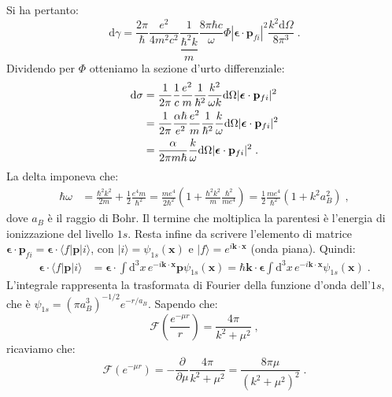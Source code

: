 \documentclass[12pt,a4paper]{report}
\theoremstyle{definition}
\numberwithin{equation}{section}
\newcommand{\diff}[1][]{\mathrm{d}#1}
\newcommand{\bra}{\langle}
\newcommand{\ket}{\rangle}
\begin{document}
Si ha pertanto:
\begin{equation}
\diff{\gamma}=\frac{2\pi}{\hbar}\frac{e^2}{4m^2c^2}\frac{1}{\dfrac{\hbar^2k}{m}}\frac{8\pi\hbar c}{\omega}\Phi|\boldsymbol{\epsilon}\cdot\mathbf{p}_{fi}|^2\frac{k^2\diff{\Omega}}{8\pi^3}\;.
\end{equation}
Dividendo per $\Phi$ otteniamo la sezione d'urto differenziale:
\begin{align}
\diff{\sigma} &= \frac{1}{2\pi}\frac{1}{c}\frac{e^2}{m}\frac{1}{\hbar^2}\frac{k^2}{\omega k}\diff{\Omega}|\boldsymbol{\epsilon}\cdot\mathbf{p}_{fi}|^2 \notag \\
&= \frac{1}{2\pi}\frac{\alpha\hbar}{e^2}\frac{e^2}{m}\frac{1}{\hbar^2}\frac{k}{\omega}\diff{\Omega}|\boldsymbol{\epsilon}\cdot\mathbf{p}_{fi}|^2 \notag \\
&= \frac{\alpha}{2\pi m\hbar}\frac{k}{\omega}\diff{\Omega}|\boldsymbol{\epsilon}\cdot\mathbf{p}_{fi}|^2\;.
\end{align}
La delta imponeva che:
\begin{align}
\hbar\omega &= \frac{\hbar^2k^2}{2m}+\frac{1}{2}\frac{e^4m}{\hbar^2}= \frac{me^4}{2\hbar^2}\left(1+\frac{\hbar^2k^2}{m}\frac{\hbar^2}{me^4}\right)= \frac{1}{2}\frac{me^4}{\hbar^2}(1+k^2a_B^2)\;,
\end{align}
dove $a_B$ è il raggio di Bohr. Il termine che moltiplica la parentesi è l'energia di ionizzazione del livello $1s$. Resta infine da scrivere l'elemento di matrice $\boldsymbol{\epsilon}\cdot\mathbf{p}_{fi}=\boldsymbol{\epsilon}\cdot\bra f|\mathbf{p}|i\ket$, con $|i\ket=\psi_{1s}(\mathbf{x})$ e $|f\ket=e^{i\mathbf{k}\cdot\mathbf{x}}$ (onda piana). Quindi:
\begin{align}
\boldsymbol{\epsilon}\cdot\bra f|\mathbf{p}|i\ket &= \boldsymbol{\epsilon}\cdot \int\diff^3{x}\,e^{-i\mathbf{k}\cdot\mathbf{x}}\mathbf{p}\psi_{1s}(\mathbf{x}) =  \hbar\mathbf{k}\cdot\boldsymbol{\epsilon}\int\diff^3{x}\,e^{-i\mathbf{k}\cdot\mathbf{x}}\psi_{1s}(\mathbf{x})\;.
\end{align}
L'integrale rappresenta la trasformata di Fourier della funzione d'onda dell'$1s$, che è $\psi_{1s}=(\pi a_B^3)^{-1/2}e^{-r/a_B}$. Sapendo che:
\begin{equation}
\mathcal{F}\left(\frac{e^{-\mu r}}{r}\right)=\frac{4\pi}{k^2+\mu^2}\;,
\end{equation}
ricaviamo che:
\begin{equation}
\mathcal{F}(e^{-\mu r})=-\frac{\partial}{\partial\mu}\frac{4\pi}{k^2+\mu^2}=\frac{8\pi\mu}{(k^2+\mu^2)^2}\;.
\end{equation}
\end{document}
